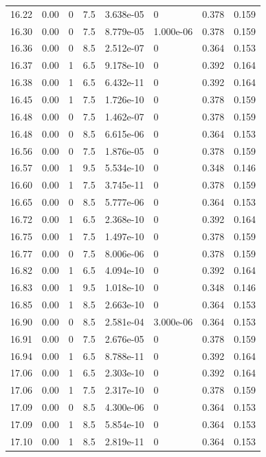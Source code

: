 \documentclass[preview]{standalone}
\begin{document}
{{{{{{{{{{{{\begin{tabular}{L{1.2cm}C{1.2cm} C{0.3cm}C{0.5cm} C{1.4cm}C{1.4cm} C{1.4cm}C{1.4cm}}
  16.22  &  0.00  & 0     & 7.5 &  3.638e-05  & 0  & 0.378 &  0.159   \\ 
  16.30  &  0.00  & 0     & 7.5 &  8.779e-05  & 1.000e-06  & 0.378 &  0.159   \\ 
  16.36  &  0.00  & 0     & 8.5 &  2.512e-07  & 0  & 0.364 &  0.153   \\ 
  16.37  &  0.00  & 1     & 6.5 &  9.178e-10  & 0  & 0.392 &  0.164   \\ 
  16.38  &  0.00  & 1     & 6.5 &  6.432e-11  & 0  & 0.392 &  0.164   \\ 
  16.45  &  0.00  & 1     & 7.5 &  1.726e-10  & 0  & 0.378 &  0.159   \\ 
  16.48  &  0.00  & 0     & 7.5 &  1.462e-07  & 0  & 0.378 &  0.159   \\ 
  16.48  &  0.00  & 0     & 8.5 &  6.615e-06  & 0  & 0.364 &  0.153   \\ 
  16.56  &  0.00  & 0     & 7.5 &  1.876e-05  & 0  & 0.378 &  0.159   \\ 
  16.57  &  0.00  & 1     & 9.5 &  5.534e-10  & 0  & 0.348 &  0.146   \\ 
  16.60  &  0.00  & 1     & 7.5 &  3.745e-11  & 0  & 0.378 &  0.159   \\ 
  16.65  &  0.00  & 0     & 8.5 &  5.777e-06  & 0  & 0.364 &  0.153   \\ 
  16.72  &  0.00  & 1     & 6.5 &  2.368e-10  & 0  & 0.392 &  0.164   \\ 
  16.75  &  0.00  & 1     & 7.5 &  1.497e-10  & 0  & 0.378 &  0.159   \\ 
  16.77  &  0.00  & 0     & 7.5 &  8.006e-06  & 0  & 0.378 &  0.159   \\ 
  16.82  &  0.00  & 1     & 6.5 &  4.094e-10  & 0  & 0.392 &  0.164   \\ 
  16.83  &  0.00  & 1     & 9.5 &  1.018e-10  & 0  & 0.348 &  0.146   \\ 
  16.85  &  0.00  & 1     & 8.5 &  2.663e-10  & 0  & 0.364 &  0.153   \\ 
  16.90  &  0.00  & 0     & 8.5 &  2.581e-04  & 3.000e-06  & 0.364 &  0.153   \\ 
  16.91  &  0.00  & 0     & 7.5 &  2.676e-05  & 0  & 0.378 &  0.159   \\ 
  16.94  &  0.00  & 1     & 6.5 &  8.788e-11  & 0  & 0.392 &  0.164   \\ 
  17.06  &  0.00  & 1     & 6.5 &  2.303e-10  & 0  & 0.392 &  0.164   \\ 
  17.06  &  0.00  & 1     & 7.5 &  2.317e-10  & 0  & 0.378 &  0.159   \\ 
  17.09  &  0.00  & 0     & 8.5 &  4.300e-06  & 0  & 0.364 &  0.153   \\ 
  17.09  &  0.00  & 1     & 8.5 &  5.854e-10  & 0  & 0.364 &  0.153   \\ 
  17.10  &  0.00  & 1     & 8.5 &  2.819e-11  & 0  & 0.364 &  0.153   \\ 
\hline 
\end{tabular} 

}}}}}}}}}}}}
\end{document}
